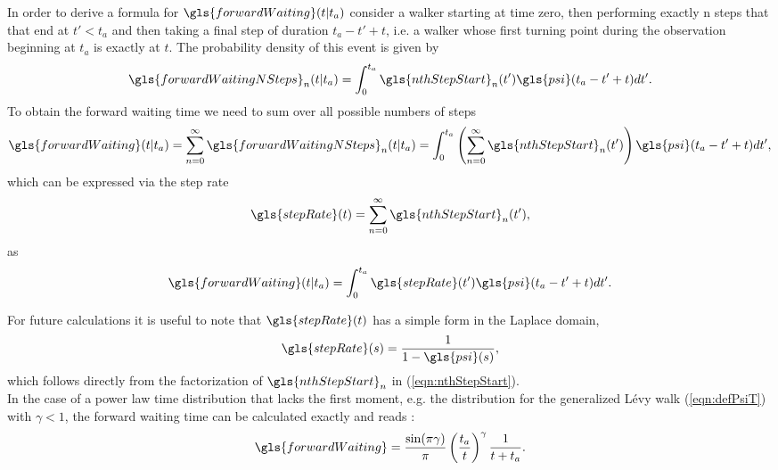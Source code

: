In order to derive a formula for $\gls{forwardWaiting}(t|t_a)$ consider a walker starting at time zero, then performing exactly n steps that that end at $t' < t_a$ and then taking a final step of duration $t_a-t'+t$, i.e. a walker whose first turning point during the observation beginning at $t_a$ is exactly at $t$. The probability density of this event is given by
%
\begin{align}
\gls{forwardWaitingNSteps}_n(t|t_a) = \int^{t_a}_{0} \gls{nthStepStart}_n(t') \gls{psi}(t_a-t'+t) dt'.
\end{align}
%
To obtain the forward waiting time we need to sum over all possible numbers of steps 
%
\begin{align}
\gls{forwardWaiting}(t|t_a) = \sum_{n=0}^{\infty} \gls{forwardWaitingNSteps}_n(t|t_a) 
= \int^{t_a}_{0} \left( \sum_{n=0}^{\infty}  \gls{nthStepStart}_n(t') \right) \gls{psi}(t_a-t'+t) dt',
\end{align}
%
which can be expressed via the step rate
%
\begin{align}
\gls{stepRate}(t) =  \sum_{n=0}^{\infty}  \gls{nthStepStart}_n(t')  \label{eqn:stepRate},
\end{align}
%
as 
%
\begin{align}
\gls{forwardWaiting}(t|t_a) = \int^{t_a}_{0} \gls{stepRate}(t') \gls{psi}(t_a-t'+t) dt'.
\end{align}

For future calculations it is useful to note that $\gls{stepRate}(t)$ has a simple form in the Laplace domain,
%
\begin{align}
\gls{stepRate}(s) = \frac{1}{1-\gls{psi}(s)} ,
\end{align}
%
which follows directly from the factorization of $\gls{nthStepStart}_n$ in (\ref{eqn:nthStepStart}).\\

In the case of a power law time distribution that lacks the first moment, e.g. the distribution for the generalized L\'evy walk (\ref{eqn:defPsiT}) with $\gamma < 1$, the forward waiting time can be calculated exactly and reads \cite{firstSteps}:
%
\begin{align}
\gls{forwardWaiting} = \frac{\sin(\pi \gamma)}{\pi} \left( \frac{t_a}{t} \right)^{\gamma} \frac{1}{t+t_a} \label{eqn:forwardWaiting} .
\end{align}

